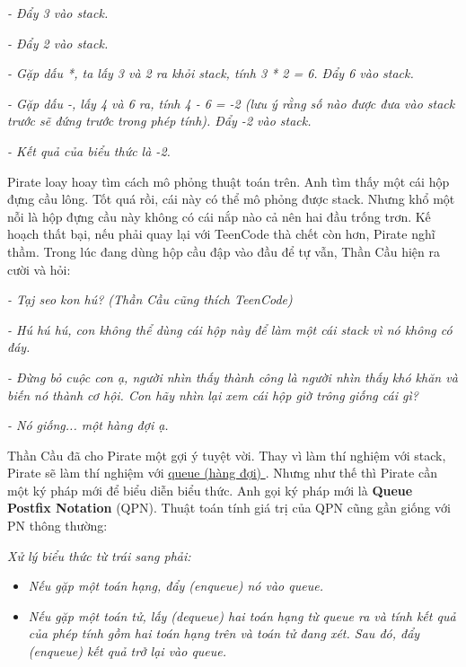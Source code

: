 \emph{    - Đẩy 3 vào stack.   }

\emph{    - Đẩy 2 vào stack.   }

\emph{    - Gặp dấu *, ta lấy 3 và 2 ra khỏi stack, tính 3 * 2 = 6. Đẩy 6 vào stack.   }

\emph{    - Gặp dấu -, lấy 4 và 6 ra, tính 4 - 6 = -2 (lưu ý rằng số nào được đưa vào stack trước sẽ đứng trước trong phép tính). Đẩy -2 vào stack.   }

\emph{    - Kết quả của biểu thức là -2.   }

   Pirate loay hoay tìm cách mô phỏng thuật toán trên. Anh tìm thấy một cái hộp đựng cầu lông. Tốt quá rồi, cái này có thể mô phỏng được stack. Nhưng khổ một nỗi là hộp đựng cầu này không có cái nắp nào cả nên hai đầu trống trơn. Kế hoạch thất bại, nếu phải quay lại với TeenCode thà chết còn hơn, Pirate nghĩ thầm. Trong lúc đang dùng hộp cầu đập vào đầu để tự vẫn, Thần Cầu hiện ra cười và hỏi:  

\emph{    - Tạj seo kon hú? (Thần Cầu cũng thích TeenCode)    
\\}

\emph{    - Hú hú hú, con không thể dùng cái hộp này để làm một cái stack vì nó không có đáy.   }

\emph{    - Đừng bỏ cuộc con ạ, người nhìn thấy thành công là người nhìn thấy khó khăn và biến nó thành cơ hội. Con hãy nhìn lại xem cái hộp giờ trông giống cái gì?   }

\emph{    - Nó giống... một hàng đợi ạ.   }

   Thần Cầu đã cho Pirate một gợi ý tuyệt vời. Thay vì làm thí nghiệm với stack, Pirate sẽ làm thí nghiệm với   \href{http://www.cosc.canterbury.ac.nz/mukundan/dsal/QueueAppl.html}{    queue (hàng đợi)   }   . Nhưng như thế thì Pirate cần một ký pháp mới để biểu diễn biểu thức. Anh gọi ký pháp mới là   \textbf{    Queue Postfix Notation   }   (QPN). Thuật toán tính giá trị của QPN cũng gần giống với PN thông thường:  

\emph{     Xử lý biểu thức từ trái sang phải:    }
\begin{itemize}
	\item \emph{      Nếu gặp một toán hạng, đẩy (enqueue) nó vào queue.     }
	\item \emph{      Nếu gặp một toán tử, lấy (dequeue) hai toán hạng từ queue ra và tính kết  quả của phép tính gồm hai toán hạng trên và toán tử đang xét. Sau đó,  đẩy (enqueue) kết quả trở lại vào queue.     }
\end{itemize}

